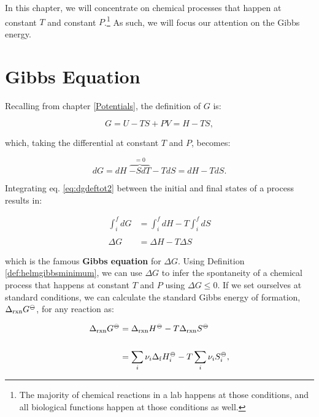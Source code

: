 \documentclass[
  9pt,
]{extbook}
\theoremstyle{definition}
\theoremstyle{definition}
\theoremstyle{definition}
\theoremstyle{definition}
\theoremstyle{remark}
\begin{document}
In this chapter, we will concentrate on chemical processes that happen at constant \(T\) and constant \(P\).\footnote{The majority of chemical reactions in a lab happens at those conditions, and all biological functions happen at those conditions as well.} As such, we will focus our attention on the Gibbs energy.

\section{Gibbs Equation}\label{gibbseqsec}

Recalling from chapter \ref{Potentials}, the definition of \(G\) is:

\begin{equation}
G = U -TS +PV = H-TS,
\label{eq:dgdeftot}
\end{equation}

which, taking the differential at constant \(T\) and \(P\), becomes:

\begin{equation}
dG = dH \; \overbrace{-SdT}^{=0} -TdS = dH -TdS.
\label{eq:dgdeftot2}
\end{equation}

Integrating eq. \eqref{eq:dgdeftot2} between the initial and final states of a process results in:

\begin{equation}
\begin{aligned}
\int_i^f dG &= \int_i^f dH -T \int_i^f dS \\
\\
\Delta G &= \Delta H -T \Delta S
\end{aligned}
\label{eq:gibbseq}
\end{equation}

which is the famous \textbf{Gibbs equation} for \(\Delta G\). Using Definition \ref{def:helmgibbsminimum}, we can use \(\Delta G\) to infer the spontaneity of a chemical process that happens at constant \(T\) and \(P\) using \(\Delta G \leq 0\). If we set ourselves at standard conditions, we can calculate the standard Gibbs energy of formation, \(\Delta_{\text{rxn}} G^{-\kern-6pt{\ominus}\kern-6pt-}\), for any reaction as:

\begin{equation}
\begin{aligned}
\Delta_{\text{rxn}} G^{-\kern-6pt{\ominus}\kern-6pt-}&= \Delta_{\text{rxn}} H^{-\kern-6pt{\ominus}\kern-6pt-}-T \Delta_{\text{rxn}} S^{-\kern-6pt{\ominus}\kern-6pt-}\\
\\
&= \sum_i \nu_i \Delta_{\mathrm{f}} H_i^{-\kern-6pt{\ominus}\kern-6pt-}- T \sum_i \nu_i S_i^{-\kern-6pt{\ominus}\kern-6pt-},
\end{aligned}
\label{eq:gibbseq2}
\end{equation}
\end{document}

